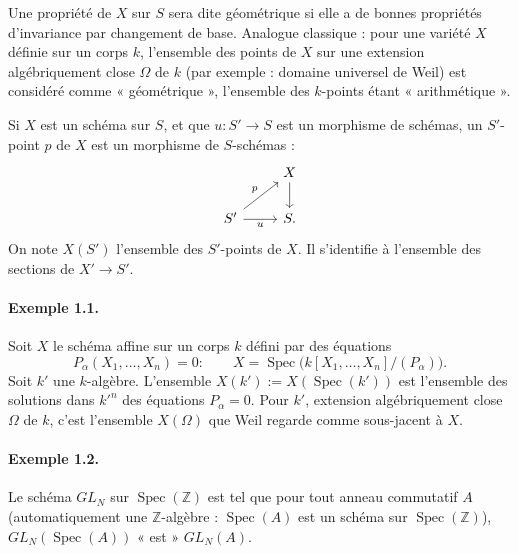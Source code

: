 \documentclass[11pt]{article}
\begin{document}
Une propriété de \(X\) sur \(S\) sera dite géométrique si elle a de bonnes propriétés d'invariance par changement de base. Analogue classique : pour une variété \(X\) définie sur un corps \(k\), l'ensemble des points de \(X\) sur une extension algébriquement close \(\Omega\) de \(k\) (par exemple : domaine universel de Weil) est considéré comme « géométrique », l'ensemble des \(k\)-points étant « arithmétique ».

Si \(X\) est un schéma sur \(S\), et que \(u:S'\to S\) est un morphisme de schémas, un \(S'\)-point \(p\) de \(X\) est un morphisme de \(S\)-schémas :
\[
\begin{tikzcd}
 & X \arrow[d]\\
S' \arrow[ur,"p"] \arrow[r,"u"'] & S .
\end{tikzcd}
\]
On note \(X(S')\) l'ensemble des \(S'\)-points de \(X\). Il s'identifie à l'ensemble des sections de \(X'\to S'\).

\paragraph{Exemple 1.1.}
Soit \(X\) le schéma affine sur un corps \(k\) défini par des équations
\[
  P_\alpha(X_1,\ldots,X_n)=0:
  \qquad
  X=\operatorname{Spec}\bigl(k[X_1,\ldots,X_n]/(P_\alpha)\bigr).
\]
Soit \(k'\) une \(k\)-algèbre. L'ensemble \(X(k'):=X(\operatorname{Spec}(k'))\) est l'ensemble des solutions dans \(k'^n\) des équations \(P_\alpha=0\). Pour \(k'\), extension algébriquement close \(\Omega\) de \(k\), c'est l'ensemble \(X(\Omega)\) que Weil regarde comme sous-jacent à \(X\).

\paragraph{Exemple 1.2.}
Le schéma \(GL_N\) sur \(\operatorname{Spec}(\mathbb Z)\) est tel que pour tout anneau commutatif \(A\) (automatiquement une \(\mathbb Z\)-algèbre : \(\operatorname{Spec}(A)\) est un schéma sur \(\operatorname{Spec}(\mathbb Z)\)), \(GL_N(\operatorname{Spec}(A))\) « est » \(GL_N(A)\).
\end{document}
